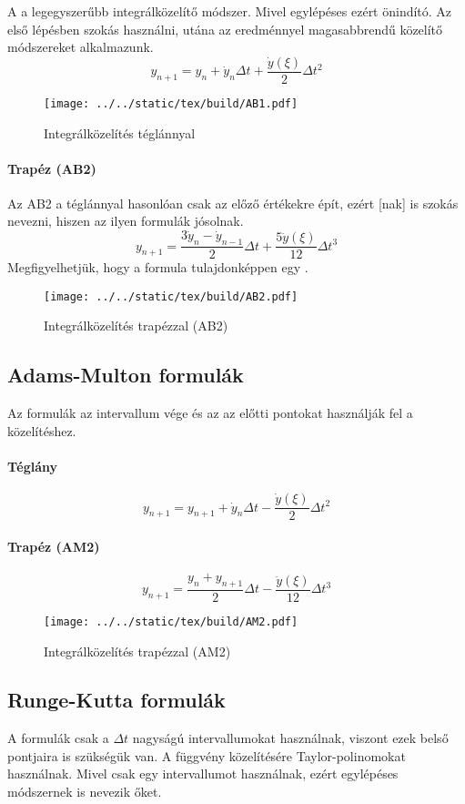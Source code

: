 \documentclass[../../main.tex]{subfiles}
\begin{document}
A  a legegyszerűbb integrálközelítő módszer. Mivel egylépéses ezért
önindító. Az első lépésben szokás használni, utána az eredménnyel magasabbrendű
közelítő módszereket alkalmazunk.
\[
  y_{n + 1}
  = y_n + \dot y_n \Delta t
  + \frac{\dot y(\xi)}{2} \Delta t^2
\]
\begin{figure}[H]
  \centering
  \texttt{[image: ../../static/tex/build/AB1.pdf]}
  \caption{Integrálközelítés téglánnyal}
  \label{fig:AB1}
\end{figure}

\paragraph{Trapéz (AB2)}

Az AB2  a téglánnyal hasonlóan csak az előző értékekre épít,
ezért [nak] is szokás nevezni, hiszen az ilyen formulák jósolnak.
\[
  y_{n+1}
  = \frac{3 \dot y_n - \dot y_{n-1}}{2} \Delta t
  + \frac{5 \ddot y(\xi)}{12} \Delta t^3
\]
Megfigyelhetjük, hogy a formula tulajdonképpen egy .

\begin{figure}[H]
  \centering
  \texttt{[image: ../../static/tex/build/AB2.pdf]}
  \caption{Integrálközelítés trapézzal (AB2)}
  \label{fig:AB2}
\end{figure}

\subsection{Adams-Multon formulák}

Az  formulák az intervallum vége és az az előtti pontokat
használják fel a közelítéshez.

\paragraph{Téglány}
\[
  y_{n + 1}
  = y_{n + 1} + \dot y_n \Delta t
  - \frac{\dot y(\xi)}{2} \Delta t^2
\]

\paragraph{Trapéz (AM2)}
\[
  y_{n + 1}
  = \frac{y_n + y_{n + 1}}{2} \Delta t
  - \frac{\ddot y(\xi)}{12} \Delta t^3
\]

\begin{figure}[H]
  \centering
  \texttt{[image: ../../static/tex/build/AM2.pdf]}
  \caption{Integrálközelítés trapézzal (AM2)}
  \label{fig:AM2}
\end{figure}


\subsection{Runge-Kutta formulák}

A  formulák csak a $\Delta t$ nagyságú intervallumokat
használnak, viszont ezek belső pontjaira is szükségük van. A függvény
közelítésére Taylor-polinomokat használnak. Mivel csak egy intervallumot
használnak, ezért egylépéses módszernek is nevezik őket.
\end{document}
